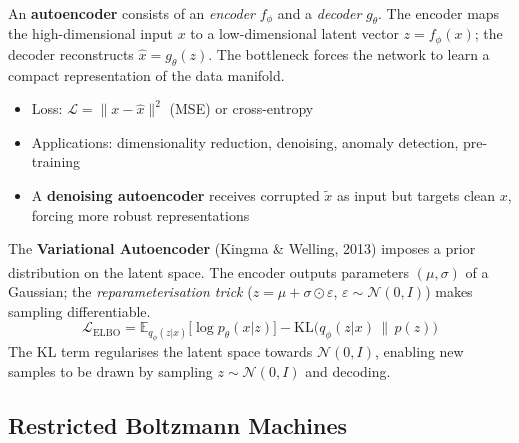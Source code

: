 \begin{tcbitemize}[ skin=sectionraster ]
    \tcbitem[title={Encoder--Bottleneck--Decoder}, raster multicolumn=3]
    An \textbf{autoencoder} consists of an \emph{encoder} $f_\phi$ and a \emph{decoder} $g_\theta$\textsuperscript{\cite[][p.~125]{fleuretLittleBookDeep}}.
    The encoder maps the high-dimensional input $x$ to a low-dimensional latent vector $z = f_\phi(x)$; the decoder reconstructs $\hat{x} = g_\theta(z)$.
    The bottleneck forces the network to learn a compact representation of the data manifold.
    \tcblower
    \begin{itemize}
        \item Loss: $\mathcal{L} = \|x - \hat{x}\|^2$ (MSE) or cross-entropy
        \item Applications: dimensionality reduction, denoising, anomaly detection, pre-training
        \item A \textbf{denoising autoencoder} receives corrupted $\tilde{x}$ as input but targets clean $x$, forcing more robust representations
    \end{itemize}

    \tcbitem[title={Variational Autoencoder (VAE)}, raster multicolumn=3]
    The \textbf{Variational Autoencoder} (Kingma \& Welling, 2013) imposes a prior distribution on the latent space\textsuperscript{\cite[][p.~125]{fleuretLittleBookDeep}}.
    The encoder outputs parameters $(\mu, \sigma)$ of a Gaussian; the \emph{reparameterisation trick} ($z = \mu + \sigma \odot \varepsilon$, $\varepsilon \sim \mathcal{N}(0,I)$) makes sampling differentiable.
    \tcblower
    \begin{equation}
        \mathcal{L}_{\mathrm{ELBO}} = \mathbb{E}_{q_\phi(z|x)}\bigl[\log p_\theta(x|z)\bigr]
        - \mathrm{KL}\bigl(q_\phi(z|x) \,\|\, p(z)\bigr)
    \end{equation}
    The KL term regularises the latent space towards $\mathcal{N}(0,I)$, enabling new samples to be drawn by sampling $z \sim \mathcal{N}(0,I)$ and decoding.
\end{tcbitemize}

\subsection{Restricted Boltzmann Machines}

